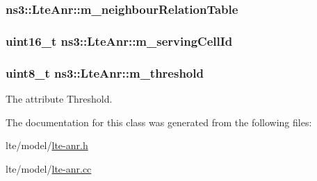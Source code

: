 \subsubsection[{\texorpdfstring{m\+\_\+neighbour\+Relation\+Table}{m_neighbourRelationTable}}]{ ns3\+::\+Lte\+Anr\+::m\+\_\+neighbour\+Relation\+Table\hspace{0.3cm}{\ttfamily [private]}}\hypertarget{classns3_1_1LteAnr_a90fc8417020463e795dc960f2f53bc24}{}\label{classns3_1_1LteAnr_a90fc8417020463e795dc960f2f53bc24}
\subsubsection[{\texorpdfstring{m\+\_\+serving\+Cell\+Id}{m_servingCellId}}]{\setlength{\rightskip}{0pt plus 5cm}uint16\+\_\+t ns3\+::\+Lte\+Anr\+::m\+\_\+serving\+Cell\+Id\hspace{0.3cm}{\ttfamily [private]}}\hypertarget{classns3_1_1LteAnr_a9a2e5aef479439b1f909f46f260f7092}{}\label{classns3_1_1LteAnr_a9a2e5aef479439b1f909f46f260f7092}
\subsubsection[{\texorpdfstring{m\+\_\+threshold}{m_threshold}}]{\setlength{\rightskip}{0pt plus 5cm}uint8\+\_\+t ns3\+::\+Lte\+Anr\+::m\+\_\+threshold\hspace{0.3cm}{\ttfamily [private]}}\hypertarget{classns3_1_1LteAnr_a8583b924012fe4beea794d9e0be15492}{}\label{classns3_1_1LteAnr_a8583b924012fe4beea794d9e0be15492}


The attribute Threshold. 



The documentation for this class was generated from the following files\+:\begin{DoxyCompactItemize}
\item 
lte/model/\hyperlink{lte-anr_8h}{lte-\/anr.\+h}\item 
lte/model/\hyperlink{lte-anr_8cc}{lte-\/anr.\+cc}\end{DoxyCompactItemize}
